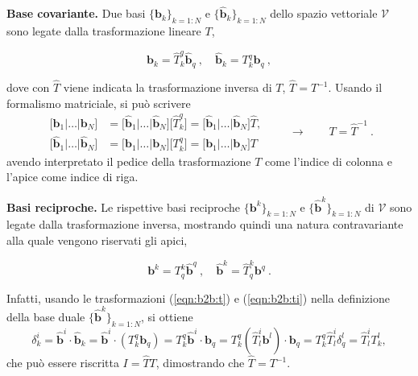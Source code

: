 \vspace{5pt} \noindent
\textbf{Base covariante.} Due basi $\{ \bm{b}_k \}_{k=1:N}$ e $\{ \bm{\hat{b}}_k \}_{k=1:N}$ dello spazio vettoriale $\mathcal{V}$ sono legate dalla trasformazione lineare $T$,
\begin{fBox}
\begin{equation}\label{eqn:b2b:t}
  \bm{b}_k = \hat{T}^q_k \bm{\hat{b}}_q \ , \quad \bm{\hat{b}}_k = {T}^q_k \bm{b}_q \ ,
\end{equation}
\end{fBox}
 dove con $\hat{T}$ viene indicata la trasformazione inversa di $T$, $\hat{T} = T^{-1}$. Usando il formalismo matriciale, si può scrivere
\begin{equation}
\begin{aligned}
 \big[ \bm{b}_1 | \dots | \bm{b}_N\big] & =
    \big[ \bm{\hat{b}}_1 | \dots | \bm{\hat{b}}_N\big] \big[ \hat{T}^{q}_{k} \big] =
    \big[ \bm{\hat{b}}_1 | \dots | \bm{\hat{b}}_N\big] \hat{T} , \\
    \big[ \bm{\hat{b}}_1 | \dots | \bm{\hat{b}}_N\big] & =
    \big[ \bm{b}_1 | \dots | \bm{b}_N\big] \big[ T^{q}_{k} \big] =
    \big[ \bm{b}_1 | \dots | \bm{b}_N\big] T
\end{aligned} \qquad \rightarrow \qquad T = \hat{T}^{-1} \ .
\end{equation}
avendo interpretato il pedice della trasformazione $T$ come l'indice di colonna e l'apice come indice di riga.

\vspace{5pt} \noindent
\textbf{Basi reciproche.} Le rispettive basi reciproche $\{ \bm{b}^k \}_{k=1:N}$ e $\{ \bm{\hat{b}}^k \}_{k=1:N}$ di $\mathcal{V}$ sono legate dalla trasformazione inversa, mostrando quindi una natura contravariante alla quale vengono riservati gli apici,
\begin{fBox}
 \begin{equation}\label{eqn:b2b:ti}
  \bm{b}^k = T^k_q \bm{\hat{b}}^q \ , \quad \bm{\hat{b}}^k = \hat{T}^k_q \bm{b}^q \ .
 \end{equation}
\end{fBox}
%
 Infatti, usando le trasformazioni (\ref{eqn:b2b:t}) e (\ref{eqn:b2b:ti}) nella definizione della base duale $\{ \bm{\hat{b}}^k \}_{k=1:N}$, si ottiene
 \begin{equation}
 \delta^i_k = \bm{\hat{b}}^i \cdot \bm{\hat{b}}_k = \bm{\hat{b}}^i \cdot (T^q_k \bm{b}_q) = T^q_k \bm{\hat{b}}^i \cdot \bm{b}_q =
   T^q_k (\hat{T}^i_l \bm{b}^l) \cdot \bm{b}_q = T^q_k \hat{T}^i_l  \delta^l_q =  \hat{T}^i_l T^l_k ,
 \end{equation}
che può essere riscritta $I = \hat{T} T$, dimostrando che $\hat{T} = T^{-1}$.

